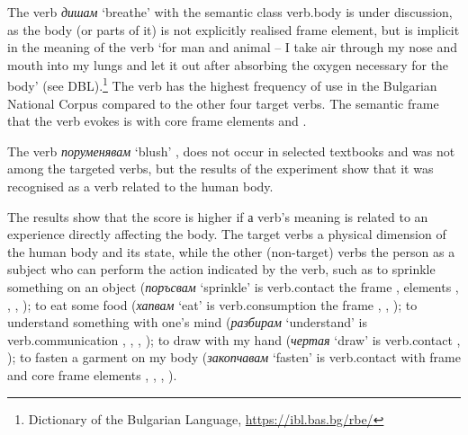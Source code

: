 \documentclass[output=paper,colorlinks,citecolor=brown]{langscibook}
\begin{document}
The verb \textit{дишам} `breathe' with the semantic class verb.body is under discussion, as the body (or parts of it) is not explicitly realised frame element, but is implicit in the meaning of the verb `for man and animal -- I take air through my nose and mouth into my lungs and let it out after absorbing the oxygen necessary for the body' (see DBL).\footnote{Dictionary of the Bulgarian Language, \url{https://ibl.bas.bg/rbe/}} The verb has the highest frequency of use in the Bulgarian National Corpus compared to the other four target verbs. The semantic frame that the verb evokes is  with core frame elements  and . 

The verb \textit{поруменявам} `blush' , does not occur in selected textbooks and was not among the targeted verbs, but the results of the experiment show that it was recognised as a verb related to the human body. 

The results show that the score is higher if а verb's meaning is related to an experience directly affecting the body. The target verbs  a physical dimension of the human body and its state, while the other (non-target) verbs  the person as a subject who can perform the action indicated by the verb, such as to sprinkle something on an object (\textit{поръсвам} `sprinkle' is verb.contact  the frame ,  elements , , , ); to eat some food (\textit{хапвам} `eat' is verb.consumption  the frame ,  , ); to understand something with one's mind (\textit{разбирам} `understand' is verb.communication  , , , ); to draw with my hand (\textit{чертая} `draw' is verb.contact  , ); to fasten a garment on my body (\textit{закопчавам} `fasten' is verb.contact with frame  and core frame elements , , , ).  
\end{document}
